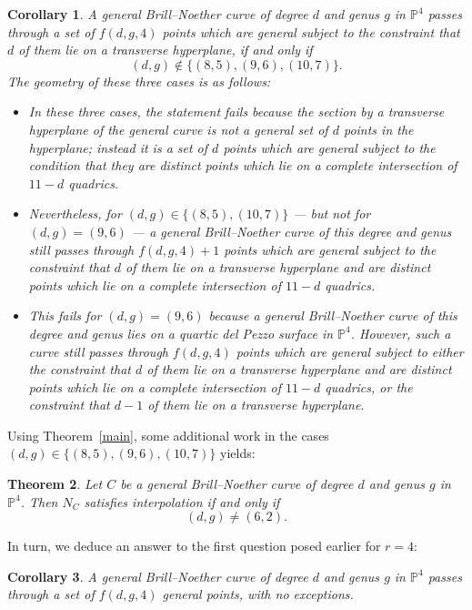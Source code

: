 \documentclass[11pt]{amsart}
\newcommand{\pp}{\mathbb{P}}
\newtheorem{ithm}{Theorem}
\newtheorem{icor}[ithm]{Corollary}
\theoremstyle{definition}
\theoremstyle{remark}
\begin{document}
\begin{icor}\label{cor_twist}
A general Brill--Noether curve of degree $d$ and genus $g$ in $\pp^4$
passes through a set of $f(d, g, 4)$ points which are general subject to
the constraint that $d$ of them lie on a transverse hyperplane,
if and only if
\[(d,g) \notin \{(8,5), (9,6), (10,7)\}.\]
The geometry of these three cases is as follows:
\begin{itemize}
\item 
In these three cases, the statement fails because
the section by a transverse hyperplane
of the general
curve is not a general set of $d$ points in the hyperplane;
instead it is a set of $d$ points which are general subject
to the condition that they are distinct points
which lie on a complete intersection of $11 - d$ quadrics.

\item 
Nevertheless, for $(d, g) \in \{(8, 5), (10, 7)\}$ --- but not for $(d, g) = (9, 6)$ --- a general
Brill--Noether curve of this degree and genus
still passes through $f(d, g, 4) + 1$ points
which are general subject to the constraint that $d$ of them lie
on a transverse hyperplane and are distinct points which lie
on a complete intersection of $11 - d$ quadrics.

\item
This fails for $(d, g) = (9, 6)$ because a general Brill--Noether curve of this degree and genus
lies on a quartic del Pezzo surface in $\pp^4$. However, such 
a curve
still passes through $f(d, g, 4)$ points
which are general subject to either the constraint that $d$ of them lie
on a transverse hyperplane and are distinct points
which lie on a complete intersection of $11 - d$ quadrics,
or the constraint that $d - 1$ of them lie on a transverse hyperplane.
\end{itemize}
\end{icor}

Using Theorem~\ref{main}, some additional work in the cases
$(d, g) \in \{(8, 5), (9, 6), (10, 7)\}$
yields:

\begin{ithm} \label{notwist}
Let $C$ be a general Brill--Noether curve of degree $d$ and genus $g$ in $\pp^4$.
Then $N_C$ satisfies interpolation if and only if
\[(d,g) \neq (6,2).\]
\end{ithm}

In turn, we deduce an answer to the first question posed earlier
for $r = 4$:

\begin{icor}\label{cor_notwist}
A general Brill--Noether curve of degree $d$ and genus $g$ in $\pp^4$
passes through a set of $f(d, g, 4)$ general points, with no exceptions.
\end{icor}
\end{document}
